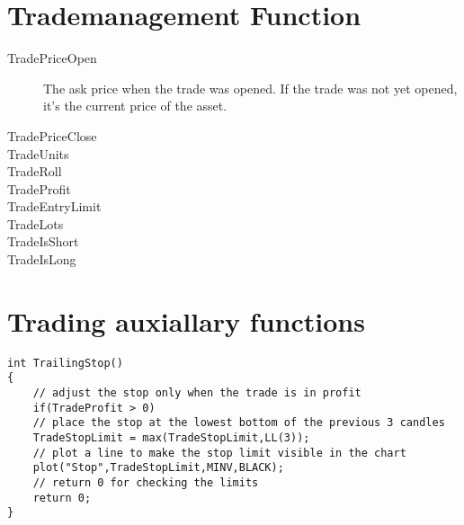 \section{Trademanagement Function}
\begin{description}
\item[TradePriceOpen] The ask price when the trade was opened. If the trade was not yet opened, it's the current price of the asset.	 
\item[TradePriceClose]
\item[TradeUnits]
\item[TradeRoll]
\item[TradeProfit]
\item[TradeEntryLimit]
\item[TradeLots]
\item[TradeIsShort]
\item[TradeIsLong] 
\end{description}
\section{Trading auxiallary functions}

\begin{lstlisting}[caption=TrailingStop]
int TrailingStop()
{
	// adjust the stop only when the trade is in profit
	if(TradeProfit > 0)
	// place the stop at the lowest bottom of the previous 3 candles
	TradeStopLimit = max(TradeStopLimit,LL(3));
	// plot a line to make the stop limit visible in the chart
	plot("Stop",TradeStopLimit,MINV,BLACK);
	// return 0 for checking the limits
	return 0;
}
\end{lstlisting}
\lstlistoflistings